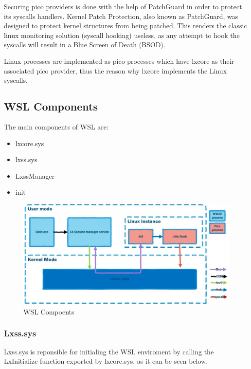             Securing pico providers is done with the help of PatchGuard in order to protect its syscalls handlers. Kernel Patch Protection,
            also known as PatchGuard, was designed to protect kernel structures from being patched. This renders the classic linux
            monitoring solution (syscall hooking) useless, as any attempt to hook the syscalls will result in a Blue Screen of Death (BSOD).


        Linux processes are implemented as pico processes which have lxcore as their associated pico provider, thus the reason why lxcore
        implements the Linux syscalls.


        \subsection{WSL Components}
            The main components of WSL are:
            \begin{itemize}
                \item lxcore.sys
                \item lxss.sys
                \item LxssManager
                \item init
            \end{itemize}

            \begin{figure}[H]
                \includegraphics[width=\linewidth]{img/wsl_components.png}
                \caption{WSL Compoents}
                \label{fig:wsl_components}
            \end{figure}

            \subsubsection{Lxss.sys}
            Lxss.sys is reponsible for initialing the WSL enviroment by calling the LxInitialize function exported by lxcore.sys, as it can be
            seen below.

